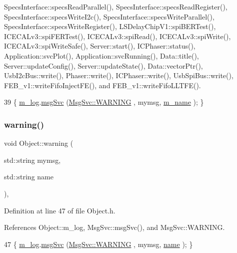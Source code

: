 Specs\+Interface\+::specs\+Read\+Parallel(), Specs\+Interface\+::specs\+Read\+Register(), Specs\+Interface\+::specs\+Write\+I2c(), Specs\+Interface\+::specs\+Write\+Parallel(), Specs\+Interface\+::specs\+Write\+Register(), L\+S\+Delay\+Chip\+V1\+::spi\+B\+E\+R\+Test(), I\+C\+E\+C\+A\+Lv3\+::spi\+F\+E\+R\+Test(), I\+C\+E\+C\+A\+Lv3\+::spi\+Read(), I\+C\+E\+C\+A\+Lv3\+::spi\+Write(), I\+C\+E\+C\+A\+Lv3\+::spi\+Write\+Safe(), Server\+::start(), I\+C\+Phaser\+::status(), Application\+::svc\+Plot(), Application\+::svc\+Running(), Data\+::title(), Server\+::update\+Config(), Server\+::update\+State(), Data\+::vector\+Ptr(), Usb\+I2c\+Bus\+::write(), Phaser\+::write(), I\+C\+Phaser\+::write(), Usb\+Spi\+Bus\+::write(), F\+E\+B\+\_\+v1\+::write\+Fifo\+Inject\+F\+E(), and F\+E\+B\+\_\+v1\+::write\+Fifo\+L\+L\+T\+F\+E().


\begin{DoxyCode}
39 \{ \hyperlink{classObject_a0d269813dd7ac1f24bc143031e2963f2}{m\_log}.\hyperlink{classMsgSvc_ad25f18047920cc59a314e5098259711c}{msgSvc} (\hyperlink{classMsgSvc_ae671eb7301996cd049d2da8a65925926a7cefae88f2ba26b2b05b676a383c834b}{MsgSvc::WARNING} , mymsg, \hyperlink{classObject_a8b83c95c705d2c3ba0d081fe1710f48d}{m\_name} ); \}
\end{DoxyCode}
\mbox{\label{classObject_a11f101db4dd73d9391b0231818881d86}} 
\subsubsection{\texorpdfstring{warning()}{warning()}\hspace{0.1cm}{\footnotesize\ttfamily [2/2]}}
{\footnotesize\ttfamily void Object\+::warning (\begin{DoxyParamCaption}\item[{std\+::string}]{mymsg,  }\item[{std\+::string}]{name }\end{DoxyParamCaption})\hspace{0.3cm}{\ttfamily [inline]}, {\ttfamily [inherited]}}



Definition at line 47 of file Object.\+h.



References Object\+::m\+\_\+log, Msg\+Svc\+::msg\+Svc(), and Msg\+Svc\+::\+W\+A\+R\+N\+I\+NG.


\begin{DoxyCode}
47 \{ \hyperlink{classObject_a0d269813dd7ac1f24bc143031e2963f2}{m\_log}.\hyperlink{classMsgSvc_ad25f18047920cc59a314e5098259711c}{msgSvc} (\hyperlink{classMsgSvc_ae671eb7301996cd049d2da8a65925926a7cefae88f2ba26b2b05b676a383c834b}{MsgSvc::WARNING} , mymsg, \hyperlink{classObject_a300f4c05dd468c7bb8b3c968868443c1}{name} ); \}
\end{DoxyCode}
\mbox{\label{classMSOxxxx_aed78c680bcec9e14a88eedf7b291518c}} 
